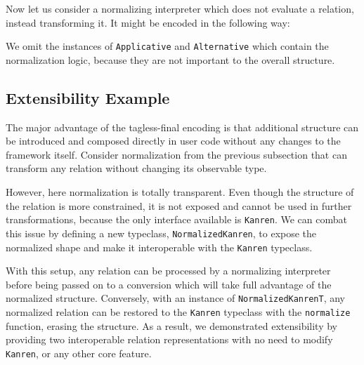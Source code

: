 Now let us consider a normalizing interpreter which does not evaluate a relation, instead transforming it. 
It might be encoded in the following way: 

We omit the instances of \lstinline{Applicative} and \lstinline{Alternative} which contain the normalization logic, because they are not important to the overall structure. 

\subsection{Extensibility Example}

The major advantage of the tagless-final encoding is that additional structure can be introduced and composed directly in user code without any changes to the framework itself.
Consider normalization from the previous subsection that can transform any relation without changing its observable type.


However, here normalization is totally transparent. 
Even though the structure of the relation is more constrained, it is not exposed and cannot be used in further transformations, because the only interface available is \lstinline{Kanren}.
We can combat this issue by defining a new typeclass, \lstinline{NormalizedKanren}, to expose the normalized shape and make it interoperable with the \lstinline{Kanren} typeclass.


With this setup, any relation can be processed by a normalizing interpreter before being passed on to a conversion which will take full advantage of the normalized structure. 
Conversely, with an instance of \lstinline{NormalizedKanrenT}, any normalized relation can be restored to the \lstinline{Kanren} typeclass with the \lstinline{normalize} function, erasing the structure.
As a result, we demonstrated extensibility by providing two interoperable relation representations with no need to modify \lstinline{Kanren}, or any other core feature. 
